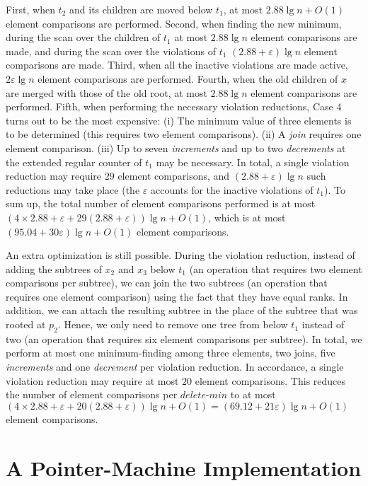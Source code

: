 \documentclass{llncs}
\newcommand{\Deletemin}{\mbox{$\mathit{delete}$\mbox{\rm -}$\mathit{min}$}}
\begin{document}
First, when $t_2$ and its children are moved below $t_1$, at most
$2.88 \lg n + O(1)$ element comparisons are performed.  Second, when
finding the new minimum, during the scan over the children of $t_1$ at
most $2.88 \lg n$ element comparisons are made, and during the scan
over the violations of $t_1$ $(2.88 + \varepsilon)\lg n$ element
comparisons are made. Third, when all the inactive violations are made
active, $2\varepsilon \lg n$ element comparisons are performed.
Fourth, when the old children of $x$ are merged with those of the old
root, at most $2.88 \lg n$ element comparisons are performed.  Fifth,
when performing the necessary violation reductions, Case 4 turns out
to be the most expensive: (i) The minimum value of three elements is
to be determined (this requires two element comparisons). (ii) A {\it join}
requires one element comparison. (iii) Up to seven {\it increments} and up
to two {\it decrements} at the extended regular counter of $t_1$ may be necessary. In total, a
single violation reduction may require $29$ element comparisons, and
$(2.88 + \varepsilon) \lg n$ such reductions may take place (the
$\varepsilon$ accounts for the inactive violations of $t_1$).  To sum
up, the total number of element comparisons performed is at most $(4
\times 2.88 + \varepsilon + 29 (2.88 + \varepsilon)) \lg n + O(1)$,
which is at most $(95.04 + 30 \varepsilon) \lg n + O(1)$ element comparisons.

An extra optimization is still possible. During the violation reduction, instead 
of adding the subtrees of $x_2$ and $x_3$ below $t_1$ (an operation that requires two
element comparisons per subtree), we can join the two subtrees (an operation that 
requires one element comparison) using the fact that they have equal ranks. 
In addition, we can attach the resulting subtree in the place of the subtree that was rooted at $p_2$. 
Hence, we only need to remove one tree from below $t_1$ instead of two 
(an operation that requires six element comparisons per subtree).
In total, we perform at most one minimum-finding among three elements, 
two joins, five {\it increments} and one {\it decrement} per violation reduction. 
In accordance, a single violation reduction may require at most $20$ element comparisons. 
This reduces the number of element comparisons per \Deletemin{} to at most
$(4 \times 2.88 + \varepsilon + 20 (2.88 + \varepsilon)) \lg n + O(1) = (69.12 + 21 \varepsilon) \lg n + O(1)$ element comparisons. 


\section{A Pointer-Machine Implementation}
\end{document}
